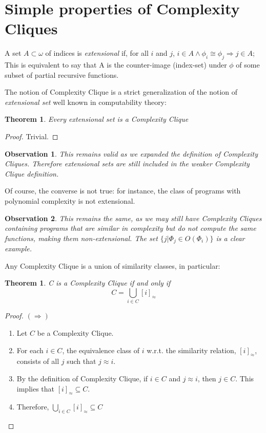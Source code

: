 \documentclass[10pt, a4paper, oneside, titlepage, draft]{article}
\newtheorem{observation}{Observation}[shrd]
\newtheorem{theorem}[shrd]{Theorem}
\begin{document}
\section{Simple properties of Complexity Cliques}
A set $A \subset \omega$ of indices is \emph{extensional} if, for all $i$ and $j$, $i \in A \wedge \phi_i \cong \phi_j \Rightarrow j \in A$; This is equivalent to say that A is the counter-image (index-set) under $\phi$ of some subset of partial recursive functions.

The notion of Complexity Clique is a strict generalization of the notion of \emph{extensional set} well known in computability theory:

\begin{theorem}
    Every extensional set is a Complexity Clique
\end{theorem}

\begin{proof}
    Trivial.
\end{proof}

\begin{observation}
    This remains valid as we expanded the definition of Complexity Cliques. Therefore extensional sets are still included in the weaker Complexity Clique definition.
\end{observation}

Of course, the converse is not true: for instance, the class of programs with polynomial complexity is not extensional.

\begin{observation}
    This remains the same, as we may still have Complexity Cliques containing programs that are similar in complexity but do not compute the same functions, making them non-extensional. The set $\{j|\Phi_j \in O(\Phi_i)\}$ is a clear example.
\end{observation}

Any Complexity Clique is a union of similarity classes, in particular:

\begin{theorem}
    C is a Complexity Clique if and only if
    \begin{equation*}
        C = \bigcup_{i \in C} [i]_{\approx}
    \end{equation*}
\end{theorem}

\begin{proof}   $(\Rightarrow)$
    \begin{enumerate}
        \item Let $C$ be a Complexity Clique.
        \item For each $i \in C$, the equivalence class of $i$ w.r.t. the similarity relation, $[i]_{\approx}$, consists of all $j$ such that $j \approx i$.
        \item By the definition of Complexity Clique, if $i\in C$ and $j \approx i$, then $j \in C$. This implies that $[i]_{\approx} \subseteq C$.
        \item Therefore, $\bigcup_{i\in C}[i]_{\approx} \subseteq C$
    \end{enumerate}
\end{proof}
\end{document}
